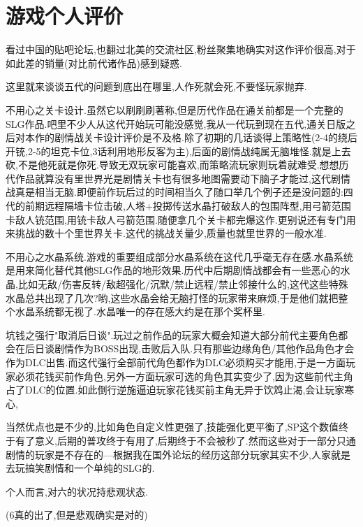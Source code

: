 \newpage
\section{游戏个人评价}

	看过中国的贴吧论坛,也翻过北美的交流社区,粉丝聚集地确实对这作评价很高,对于如此差的销量(对比前代诸作品)感到疑惑.

	这里就来谈谈五代的问题到底出在哪里,人作死就会死,不要怪玩家抛弃.

	不用心之关卡设计.虽然它以刷刷刷著称,但是历代作品在通关前都是一个完整的SLG作品.吧里不少人从这代开始玩可能没感觉,我从一代玩到现在五代,通关日版之后对本作的剧情战关卡设计评价是不及格.除了初期的几话谈得上策略性(2-4的绕后开铳,2-5的坦克卡位,3话利用地形反客为主),后面的剧情战纯属无脑堆怪.就是上去砍,不是他死就是你死.导致无双玩家可能喜欢,而策略流玩家则玩着就难受.想想历代作品就算没有里世界光是剧情关卡也有很多地图需要动下脑子才能过,这代剧情战真是相当无脑.即便前作玩后过的时间相当久了随口举几个例子还是没问题的:四代的前期远程隔墙卡位击破,人塔+投掷传送水晶打破敌人的包围阵型,用弓箭范围卡敌人铳范围,用铳卡敌人弓箭范围.随便拿几个关卡都完爆这作.更别说还有专门用来挑战的数十个里世界关卡.这代的挑战关量少,质量也就里世界的一般水准.

	不用心之水晶系统.游戏的重要组成部分水晶系统在这代几乎毫无存在感.水晶系统是用来简化替代其他SLG作品的地形效果.历代中后期剧情战都会有一些恶心的水晶,比如无敌/伤害反转/敌超强化/沉默/禁止远程/禁止邻接什么的,这代这些特殊水晶总共出现了几次?哟,这些水晶会给无脑打怪的玩家带来麻烦,于是他们就把整个水晶系统都无视了.水晶唯一的存在感大约是在那个奖杯里.

	坑钱之强行"取消后日谈".玩过之前作品的玩家大概会知道大部分前代主要角色都会在后日谈剧情作为BOSS出现,击败后入队.只有那些边缘角色/其他作品角色才会作为DLC出售.而这代强行全部前代角色都作为DLC必须购买才能用,于是一方面玩家必须花钱买前作角色,另外一方面玩家可选的角色其实变少了,因为这些前代主角占了DLC的位置.如此倒行逆施逼迫玩家花钱买前主角无异于饮鸩止渴,会让玩家寒心,

	当然优点也是不少的,比如角色自定义性更强了,技能强化更平衡了,SP这个数值终于有了意义,后期的普攻终于有用了,后期终于不会被秒了.然而这些对于一部分只通剧情的玩家是不存在的---根据我在国外论坛的经历这部分玩家其实不少,人家就是去玩搞笑剧情和一个单纯的SLG的.

	个人而言,对六的状况持悲观状态.


	(6真的出了,但是悲观确实是对的)